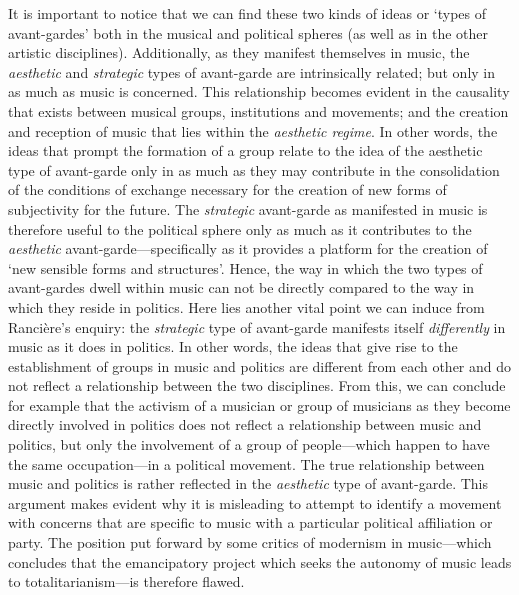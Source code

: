 It is important to notice that we can find these two kinds of ideas or `types of avant-gardes' both in the musical and political spheres (as well as in the other artistic disciplines). Additionally, as they manifest themselves in music, the \emph{aesthetic} and \emph{strategic} types of avant-garde are intrinsically related; but only in as much as music is concerned.  This relationship becomes evident in the causality that exists between musical groups, institutions and movements; and the creation and reception of music that lies within the \emph{aesthetic regime}. In other words, the ideas that prompt the formation of a group relate to the idea of the aesthetic type of avant-garde only in as much as they may contribute in the consolidation of the conditions of exchange necessary for the creation of new forms of subjectivity for the future. The \emph{strategic} avant-garde as manifested in music is therefore useful to the political sphere only as much as it contributes to the \emph{aesthetic} avant-garde---specifically as it provides a platform for the creation of `new sensible forms and structures'. Hence, the way in which the two types of avant-gardes dwell within music can not be directly compared to the way in which they reside in politics. Here lies another vital point we can induce from Ranci\`{e}re's enquiry: the \emph{strategic} type of avant-garde manifests itself \emph{differently} in music as it does in politics. In other words, the ideas that give rise to the establishment of groups in music and politics are different from each other and do not reflect a relationship between the two disciplines. From this, we can conclude for example that the activism of a musician or group of musicians as they become directly involved in politics does not reflect a relationship between music and politics, but only the involvement of a group of people---which happen to have the same occupation---in a political movement. The true relationship between music and politics is rather reflected in the \emph{aesthetic} type of avant-garde. This argument makes evident why it is misleading to attempt to identify a movement with concerns that are specific to music with a particular political affiliation or party. The position put forward by some critics of modernism in music---which concludes that the emancipatory project which seeks the autonomy of music leads to totalitarianism---is therefore flawed.  

